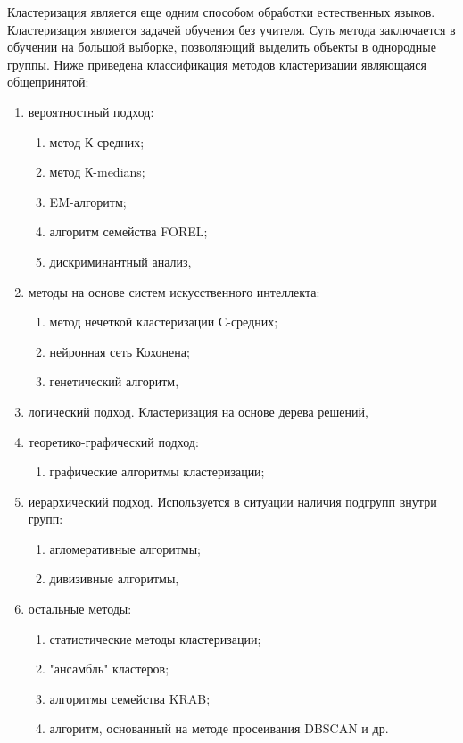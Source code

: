 \documentclass{standalone}
\begin{document}
\par Кластеризация является еще одним способом обработки естественных языков. Кластеризация является задачей обучения без учителя. Суть метода заключается в обучении на большой выборке, позволяющий выделить объекты в однородные группы. Ниже приведена классификация методов кластеризации являющаяся общепринятой:
\begin{enumerate}
    \item вероятностный подход:
        \begin{enumerate}
            \item метод К-средних;
            \item метод К-medians;
            \item EM-алгоритм;
            \item алгоритм семейства FOREL;
            \item дискриминантный анализ,
        \end{enumerate}
    \item методы на основе систем искусственного интеллекта:
        \begin{enumerate}
            \item метод нечеткой кластеризации С-средних;
            \item нейронная сеть Кохонена;
            \item генетический алгоритм,
        \end{enumerate}
    \item логический подход. Кластеризация на основе дерева решений,
    \item теоретико-графический подход:
        \begin{enumerate}
            \item графические алгоритмы кластеризации;
        \end{enumerate}
    \item иерархический подход. Используется в ситуации наличия подгрупп внутри групп:
        \begin{enumerate}
            \item агломеративные алгоритмы;
            \item дивизивные алгоритмы,
        \end{enumerate}
    \item остальные методы:
        \begin{enumerate}
            \item статистические методы кластеризации;
            \item "ансамбль" кластеров;
            \item алгоритмы семейства KRAB;
            \item алгоритм, основанный на методе просеивания DBSCAN и др.
        \end{enumerate}
\end{enumerate}
\end{document}
